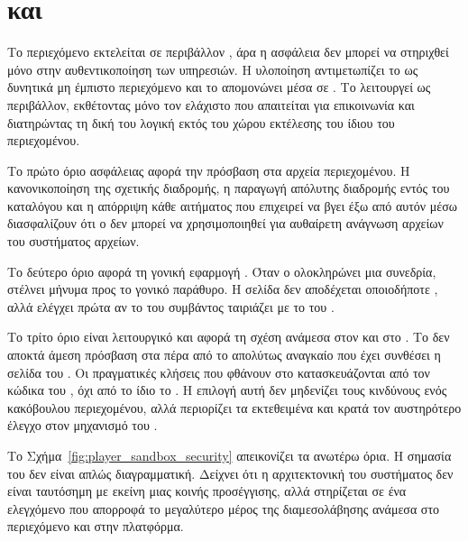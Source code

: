 \section{ και }
\label{sec:player_sandbox_security}

Το περιεχόμενο εκτελείται σε περιβάλλον , άρα η ασφάλεια δεν μπορεί να στηριχθεί μόνο στην αυθεντικοποίηση των  υπηρεσιών. Η υλοποίηση αντιμετωπίζει το  ως δυνητικά μη έμπιστο περιεχόμενο και το απομονώνει μέσα σε . Το  λειτουργεί ως  περιβάλλον, εκθέτοντας μόνο τον ελάχιστο  που απαιτείται για  επικοινωνία και διατηρώντας τη δική του λογική  εκτός του χώρου εκτέλεσης του ίδιου του περιεχομένου.

Το πρώτο όριο ασφάλειας αφορά την πρόσβαση στα αρχεία περιεχομένου. Η κανονικοποίηση της σχετικής διαδρομής, η παραγωγή απόλυτης διαδρομής εντός του  καταλόγου και η απόρριψη κάθε αιτήματος που επιχειρεί να βγει έξω από αυτόν μέσω  διασφαλίζουν ότι ο  \texttt{} δεν μπορεί να χρησιμοποιηθεί για αυθαίρετη ανάγνωση αρχείων του συστήματος αρχείων.

Το δεύτερο όριο αφορά τη γονική εφαρμογή . Όταν ο  ολοκληρώνει μια συνεδρία, στέλνει μήνυμα \texttt{} προς το γονικό παράθυρο. Η σελίδα \texttt{} δεν αποδέχεται οποιοδήποτε , αλλά ελέγχει πρώτα αν το  του συμβάντος ταιριάζει με το  του .

Το τρίτο όριο είναι λειτουργικό και αφορά τη σχέση ανάμεσα στον  και στο . Το  δεν αποκτά άμεση πρόσβαση στα  πέρα από το απολύτως αναγκαίο  που έχει συνθέσει η σελίδα του . Οι πραγματικές  κλήσεις που φθάνουν στο  κατασκευάζονται από τον  κώδικα του , όχι από το ίδιο το . Η επιλογή αυτή δεν μηδενίζει τους κινδύνους ενός κακόβουλου περιεχομένου, αλλά περιορίζει τα εκτεθειμένα  και κρατά τον αυστηρότερο έλεγχο στον  μηχανισμό του .

Το Σχήμα~\ref{fig:player_sandbox_security} απεικονίζει τα ανωτέρω όρια. Η σημασία του δεν είναι απλώς διαγραμματική. Δείχνει ότι η  αρχιτεκτονική του συστήματος δεν είναι ταυτόσημη με εκείνη μιας κοινής  προσέγγισης, αλλά στηρίζεται σε ένα ελεγχόμενο  που απορροφά το μεγαλύτερο μέρος της διαμεσολάβησης ανάμεσα στο περιεχόμενο και στην πλατφόρμα.


